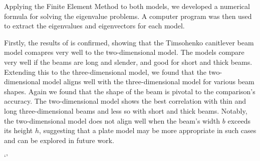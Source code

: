 Applying the Finite Element Method to both models, we developed a numerical formula for solving the eigenvalue problems. A computer program was then used to extract the eigenvalues and eigenvectors for each model.

Firstly, the results of \cite{LVV09} is confirmed, showing that the Timsohenko canitlever beam model comapres very well to the two-dimensional model. The models compare very well if the beams are long and slender, and good for short and thick beams. Extending this to the three-dimensional model, we found that the two-dimensional model aligns well with the three-dimensional model for various beam shapes. Again we found that the shape of the beam is pivotal to the comparison's accuracy. The two-dimensional model shows the best correlation with thin and long three-dimensional beams and less so with short and thick beams. Notably, the two-dimensional model does not align well when the beam's width $b$ exceeds its height $h$, suggesting that a plate model may be more appropriate in such cases and can be explored in future work.




`'